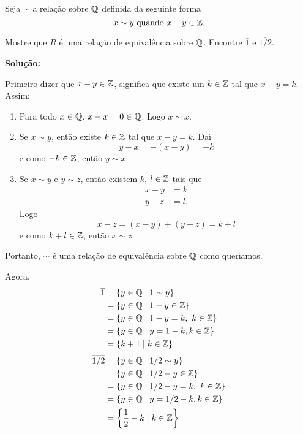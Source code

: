 \documentclass[12pt]{exam}
\begin{document}
\vspace{.5cm}

\questao Seja $\sim$ a rela\c{c}\~ao sobre $\mathbb{Q}$ definida da seguinte forma
\[
	x\sim y \mbox{ quando } x - y \in \mathbb{Z}.
\]

Mostre que $R$ \'e uma rela{\c c}{\~a}o de equival{\^e}ncia sobre $\mathbb{Q}$. Encontre $\overline{1}$ e $\overline{1/2}$.


\noindent\textbf{Solu\c{c}\~ao:}

Primeiro dizer que $x - y \in \mathbb{Z}$, significa que existe um $k \in \mathbb{Z}$ tal que $x - y = k$. Assim:
\begin{enumerate}[label={\roman*})]
	\item Para todo $x \in \mathbb{Q}$, $x - x = 0 \in \mathbb{Q}$. Logo $x \sim x$.
	\item Se $x \sim y$, ent\~ao existe $k \in \mathbb{Z}$ tal que $x - y = k$. Da{\'\i}
	\[
		y - x = -(x - y) = -k
	\]
	e como $-k \in \mathbb{Z}$, ent\~ao $y \sim x$.
	\item Se $x \sim y$ e $y \sim z$, ent\~ao existem $k$, $l \in \mathbb{Z}$ tais que
	\begin{align*}
		x - y &= k\\
		y - z &= l.
	\end{align*}
	Logo
	\[
		x - z = (x - y) + (y - z) = k + l
	\]
	e como $k + l \in \mathbb{Z}$, ent\~ao $x \sim z$.
\end{enumerate}

Portanto, $\sim$ \'e uma rela\c{c}\~ao de equival\^encia sobre $\mathbb{Q}$ como quer{\'\i}amos.

Agora,
\begin{align*}
	\overline{1} &= \{y \in \mathbb{Q} \mid 1 \sim y\} \\&= \{y \in \mathbb{Q} \mid 1 - y \in \mathbb{Z}\} \\&= \{y \in \mathbb{Q} \mid 1 - y = k,\ k \in \mathbb{Z}\}\\&= \{y \in \mathbb{Q} \mid y = 1 - k, k \in \mathbb{Z}\} \\&= \{k + 1 \mid k \in \mathbb{Z}\}
\end{align*}
\begin{align*}
	\overline{1/2} &= \{y \in \rac \mid 1/2 \sim y\} \\&= \{y \in \rac \mid 1/2 - y \in \z\} \\&= \{y \in \rac \mid 1/2 - y = k,\ k \in \z\} \\&= \{y \in \rac \mid y = 1/2 - k, k \in \z\} \\&= \left\{\dfrac{1}{2} - k \mid k \in \z\right\}
\end{align*}
\end{document}

